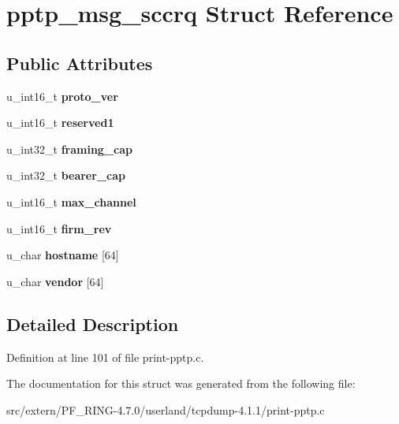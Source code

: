 \hypertarget{structpptp__msg__sccrq}{
\section{pptp\_\-msg\_\-sccrq Struct Reference}
\label{structpptp__msg__sccrq}
}
\subsection*{Public Attributes}
\begin{DoxyCompactItemize}
\item 
\hypertarget{structpptp__msg__sccrq_a4007731d5a4016140a3376a26efbc950}{
u\_\-int16\_\-t {\bfseries proto\_\-ver}}
\label{structpptp__msg__sccrq_a4007731d5a4016140a3376a26efbc950}

\item 
\hypertarget{structpptp__msg__sccrq_a6682f590cfbe9855b76358350514ae20}{
u\_\-int16\_\-t {\bfseries reserved1}}
\label{structpptp__msg__sccrq_a6682f590cfbe9855b76358350514ae20}

\item 
\hypertarget{structpptp__msg__sccrq_ad96d34cb661e4f2de1f84694f2c99399}{
u\_\-int32\_\-t {\bfseries framing\_\-cap}}
\label{structpptp__msg__sccrq_ad96d34cb661e4f2de1f84694f2c99399}

\item 
\hypertarget{structpptp__msg__sccrq_ae1c1f1c0de753ccf723872b7fdec7a0c}{
u\_\-int32\_\-t {\bfseries bearer\_\-cap}}
\label{structpptp__msg__sccrq_ae1c1f1c0de753ccf723872b7fdec7a0c}

\item 
\hypertarget{structpptp__msg__sccrq_afa39805a1af28250ea933b9b5c8c1979}{
u\_\-int16\_\-t {\bfseries max\_\-channel}}
\label{structpptp__msg__sccrq_afa39805a1af28250ea933b9b5c8c1979}

\item 
\hypertarget{structpptp__msg__sccrq_afd9cdd39a55d2150d30d53594ea2632f}{
u\_\-int16\_\-t {\bfseries firm\_\-rev}}
\label{structpptp__msg__sccrq_afd9cdd39a55d2150d30d53594ea2632f}

\item 
\hypertarget{structpptp__msg__sccrq_a6708b4c4f4d4a671d163bb395d846b6e}{
u\_\-char {\bfseries hostname} \mbox{[}64\mbox{]}}
\label{structpptp__msg__sccrq_a6708b4c4f4d4a671d163bb395d846b6e}

\item 
\hypertarget{structpptp__msg__sccrq_a08ef26f3b1aa38bbd60d2c4360a76eeb}{
u\_\-char {\bfseries vendor} \mbox{[}64\mbox{]}}
\label{structpptp__msg__sccrq_a08ef26f3b1aa38bbd60d2c4360a76eeb}

\end{DoxyCompactItemize}


\subsection{Detailed Description}


Definition at line 101 of file print-\/pptp.c.



The documentation for this struct was generated from the following file:\begin{DoxyCompactItemize}
\item 
src/extern/PF\_\-RING-\/4.7.0/userland/tcpdump-\/4.1.1/print-\/pptp.c\end{DoxyCompactItemize}
